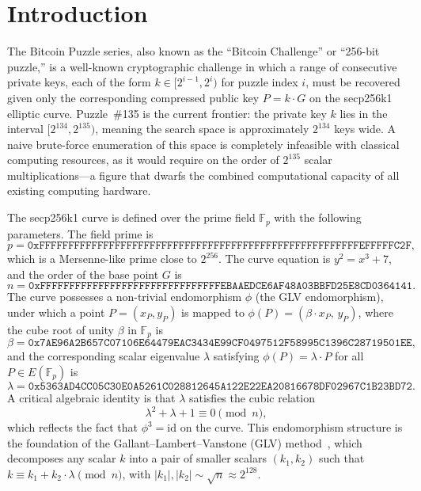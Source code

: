 \documentclass[11pt,a4paper]{article}
\theoremstyle{definition}
\begin{document}
\tableofcontents
\newpage

\section{Introduction}

The Bitcoin Puzzle series, also known as the ``Bitcoin Challenge'' or ``256-bit puzzle,'' is a well-known cryptographic challenge in which a range of consecutive private keys, each of the form $k \in [2^{i-1}, 2^{i})$ for puzzle index $i$, must be recovered given only the corresponding compressed public key $P = k \cdot G$ on the secp256k1 elliptic curve. Puzzle~\#135 is the current frontier: the private key $k$ lies in the interval $[2^{134}, 2^{135})$, meaning the search space is approximately $2^{134}$ keys wide. A naive brute-force enumeration of this space is completely infeasible with classical computing resources, as it would require on the order of $2^{135}$ scalar multiplications---a figure that dwarfs the combined computational capacity of all existing computing hardware.

The secp256k1 curve is defined over the prime field $\mathbb{F}_p$ with the following parameters. The field prime is
\begin{equation}
  p = \texttt{0xFFFFFFFFFFFFFFFFFFFFFFFFFFFFFFFFFFFFFFFFFFFFFFFFFFFFFFFEFFFFFC2F},
\end{equation}
which is a Mersenne-like prime close to $2^{256}$. The curve equation is $y^2 = x^3 + 7$, and the order of the base point $G$ is
\begin{equation}
  n = \texttt{0xFFFFFFFFFFFFFFFFFFFFFFFFFFFFFFFEBAAEDCE6AF48A03BBFD25E8CD0364141}.
\end{equation}
The curve possesses a non-trivial endomorphism $\phi$ (the GLV endomorphism), under which a point $P = (x_P, y_P)$ is mapped to $\phi(P) = (\beta \cdot x_P,\, y_P)$, where the cube root of unity $\beta$ in $\mathbb{F}_p$ is
\begin{equation}
  \beta = \texttt{0x7AE96A2B657C07106E64479EAC3434E99CF0497512F58995C1396C28719501EE},
\end{equation}
and the corresponding scalar eigenvalue $\lambda$ satisfying $\phi(P) = \lambda \cdot P$ for all $P \in E(\mathbb{F}_p)$ is
\begin{equation}
  \lambda = \texttt{0x5363AD4CC05C30E0A5261C028812645A122E22EA20816678DF02967C1B23BD72}.
\end{equation}
A critical algebraic identity is that $\lambda$ satisfies the cubic relation
\begin{equation}
  \lambda^2 + \lambda + 1 \equiv 0 \pmod{n},
  \label{eq:lambda-cubic}
\end{equation}
which reflects the fact that $\phi^3 = \mathrm{id}$ on the curve. This endomorphism structure is the foundation of the Gallant--Lambert--Vanstone (GLV) method~\cite{GLV2001}, which decomposes any scalar $k$ into a pair of smaller scalars $(k_1, k_2)$ such that $k \equiv k_1 + k_2 \cdot \lambda \pmod{n}$, with $|k_1|, |k_2| \sim \sqrt{n} \approx 2^{128}$.
\end{document}
